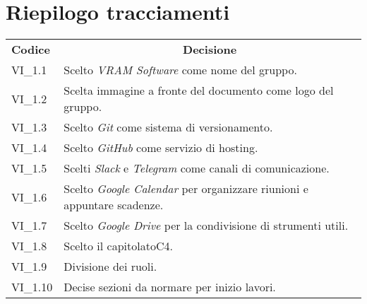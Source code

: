 % 
\section{Riepilogo tracciamenti}
\begin{longtable} {
		>{\centering}p{17mm} 
		>{}p{120mm}}
	\rowcolor{gray!50}
	\textbf{Codice} & \multicolumn{1}{c}{\textbf{Decisione}} \\%
	VI\_1.1 & Scelto \textit{VRAM Software} come nome del gruppo. \TBstrut \\ [2mm]
	VI\_1.2 & Scelta immagine a fronte del documento come logo del gruppo. \TBstrut \\ [2mm]
	VI\_1.3 & Scelto \textit{Git} come sistema di versionamento\glo. \TBstrut \\ [2mm]
	VI\_1.4 & Scelto \textit{GitHub} come servizio di hosting. \TBstrut \\ [2mm]
	VI\_1.5 & Scelti \textit{Slack} e \textit{Telegram} come canali di comunicazione. \TBstrut \\ [2mm]
	VI\_1.6 & Scelto \textit{Google Calendar} per organizzare riunioni e appuntare scadenze. \TBstrut \\ [2mm]
	VI\_1.7 & Scelto \textit{Google Drive} per la condivisione di strumenti utili. \TBstrut \\ [2mm]
	VI\_1.8 & Scelto il capitolato\glosp C4. \TBstrut \\ [2mm]
	VI\_1.9 & Divisione dei ruoli. \TBstrut \\ [2mm]
	VI\_1.10 & Decise sezioni da normare per inizio lavori. \TBstrut \\ [2mm]
\end{longtable}